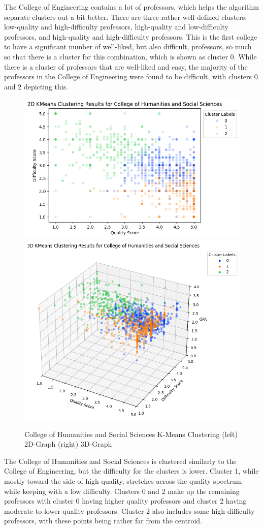 \documentclass[sigconf,nonacm]{acmart}
\begin{document}
The College of Engineering contains a lot of professors, which helps the algorithm separate clusters out a bit better. There are three rather well-defined clusters: low-quality and high-difficulty professors, high-quality and low-difficulty professors, and high-quality and high-difficulty professors. This is the first college to have a significant number of well-liked, but also difficult, professors, so much so that there is a cluster for this combination, which is shown as cluster 0. While there is a cluster of professors that are well-liked and easy, the majority of the professors in the College of Engineering were found to be difficult, with clusters 0 and 2 depicting this.

\begin{figure}[H]
    \centering
    \includegraphics[width=0.45\linewidth]{images/humanities-2d.png}
    \includegraphics[width=0.45\linewidth]{images/humanities-3d.png}
    \caption{College of Humanities and Social Sciences K-Means Clustering (left) 2D-Graph (right) 3D-Graph}
    \label{fig:enter-label}
\end{figure}

The College of Humanities and Social Sciences is clustered similarly to the College of Engineering, but the difficulty for the clusters is lower. Cluster 1, while mostly toward the side of high quality, stretches across the quality spectrum while keeping with a low difficulty. Clusters 0 and 2 make up the remaining professors with cluster 0 having higher quality professors and cluster 2 having moderate to lower quality professors. Cluster 2 also includes some high-difficulty professors, with these points being rather far from the centroid.
\end{document}
